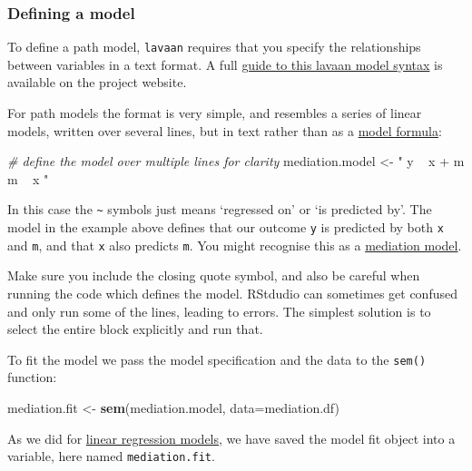 \documentclass[]{article}
\newenvironment{Shaded}{\begin{snugshade}}{\end{snugshade}}
\newcommand{\KeywordTok}[1]{\textcolor[rgb]{0.13,0.29,0.53}{\textbf{#1}}}
\newcommand{\DataTypeTok}[1]{\textcolor[rgb]{0.13,0.29,0.53}{#1}}
\newcommand{\StringTok}[1]{\textcolor[rgb]{0.31,0.60,0.02}{#1}}
\newcommand{\CommentTok}[1]{\textcolor[rgb]{0.56,0.35,0.01}{\textit{#1}}}
\newcommand{\NormalTok}[1]{#1}
\theoremstyle{definition}
\theoremstyle{definition}
\theoremstyle{definition}
\theoremstyle{remark}
\begin{document}
\subsubsection*{Defining a model}\label{defining-a-model}

To define a path model, \texttt{lavaan} requires that you specify the
relationships between variables in a text format. A full
\href{http://lavaan.ugent.be/tutorial/syntax1.html}{guide to this lavaan
model syntax} is available on the project website.

For path models the format is very simple, and resembles a series of
linear models, written over several lines, but in text rather than as a
\protect\hyperlink{formulae}{model formula}:

\begin{Shaded}
\begin{Highlighting}[]
\CommentTok{# define the model over multiple lines for clarity}
\NormalTok{mediation.model <-}\StringTok{ "}
\StringTok{  y ~ x + m}
\StringTok{  m ~ x}
\StringTok{"}
\end{Highlighting}
\end{Shaded}

In this case the \texttt{\textasciitilde{}} symbols just means
`regressed on' or `is predicted by'. The model in the example above
defines that our outcome \texttt{y} is predicted by both \texttt{x} and
\texttt{m}, and that \texttt{x} also predicts \texttt{m}. You might
recognise this as a \protect\hyperlink{mediation}{mediation model}.

{Make sure you include the closing quote symbol, and also be careful
when running the code which defines the model. RStdudio can sometimes
get confused and only run some of the lines, leading to errors. The
simplest solution is to select the entire block explicitly and run
that.}

To fit the model we pass the model specification and the data to the
\texttt{sem()} function:

\begin{Shaded}
\begin{Highlighting}[]
\NormalTok{mediation.fit <-}\StringTok{ }\KeywordTok{sem}\NormalTok{(mediation.model, }\DataTypeTok{data=}\NormalTok{mediation.df)}
\end{Highlighting}
\end{Shaded}

As we did for \protect\hyperlink{linear-models-simple}{linear regression
models}, we have saved the model fit object into a variable, here named
\texttt{mediation.fit}.
\end{document}
